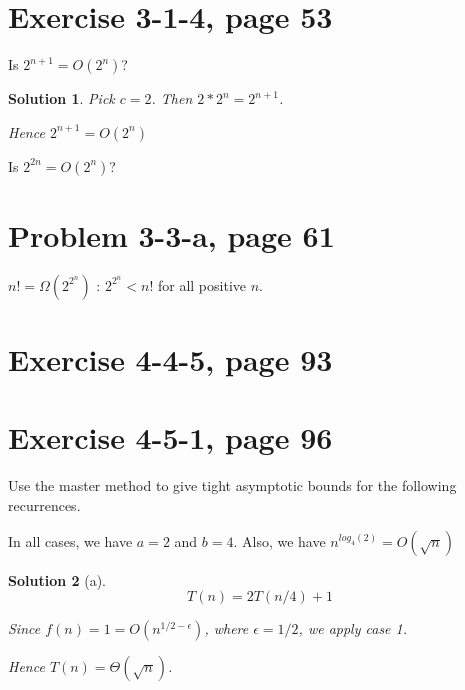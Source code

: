 \documentclass[letterpaper, 11pt]{article}
\theoremstyle{mystyle}
\newtheorem*{sln}{Solution}
\begin{document}
\section{Exercise 3-1-4, page 53}
Is $2^{n+1} = O(2^n)$? 

\begin{sln}
    Pick $c=2$. Then $2 * 2^n = 2^{n+1}$. 

    Hence $2^{n+1} = O(2^n)$
\end{sln}

Is $2^{2n} = O(2^n)$?


\section{Problem 3-3-a, page 61}

\begin{compactitem} 
    \item $n! = \Omega(2^{2^n})$ : $2^{2^n} < n!$ for all positive $n$. 

\end{compactitem}


\section{Exercise 4-4-5, page 93}


\section{Exercise 4-5-1, page 96}
Use the master method to give tight asymptotic bounds for the following recurrences.

In all cases, we have $a=2$ and $b=4$. Also, we have $n^{log_4 (2)} = O(\sqrt{n})$

\begin{sln}[a]
    \[T(n) = 2T(n/4) + 1\]

    Since $f(n) = 1 = O(n^{1/2 - \epsilon})$, where $\epsilon = 1/2$, we apply case 1.

    Hence $T(n) = \Theta (\sqrt{n})$.
\end{sln}
\end{document}
